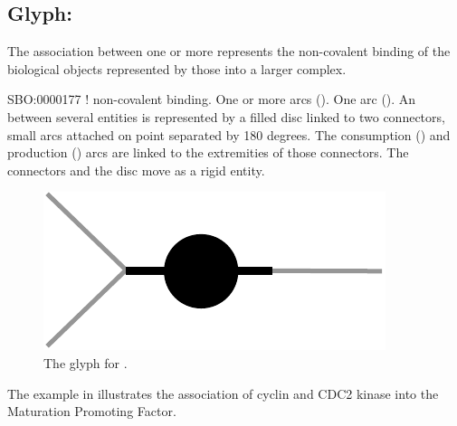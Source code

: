 

\subsection{Glyph: }\label{sec:association}

The association between one or more  represents the non-covalent binding of the biological objects represented by those  into a larger complex.

\begin{glyphDescription}
 \glyphSboTerm SBO:0000177 ! non-covalent binding.
 \glyphOrigin One or more  arcs ().
 \glyphTarget  One  arc ().
 \glyphNode An  between several entities is represented by a filled disc linked to two connectors, small arcs attached on point separated by 180 degrees. The consumption () and production () arcs are linked to the extremities of those connectors. The connectors and the disc move as a rigid entity.
 \end{glyphDescription}

\begin{figure}[H]
  \centering
  \includegraphics[scale = 0.5]{images/association}
  \caption{The \PD glyph for .}
  \label{fig:association}
\end{figure}

The example in  illustrates the association of cyclin and CDC2 kinase into the Maturation Promoting Factor.

